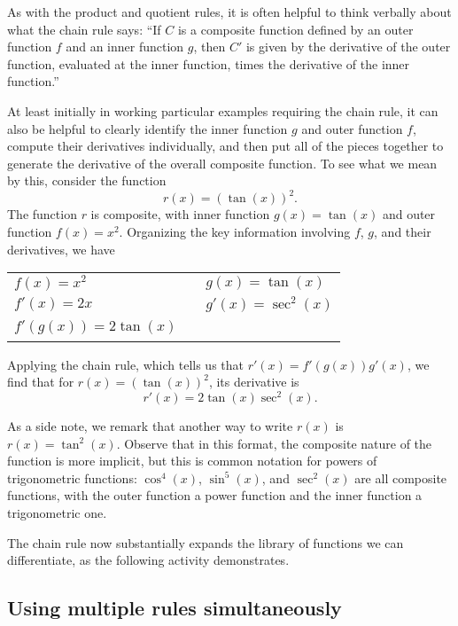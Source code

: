 As with the product and quotient rules, it is often helpful to think verbally about what the chain rule says: ``If $C$ is a composite function defined by an outer function $f$ and an inner function $g$, then $C'$ is given by the derivative of the outer function, evaluated at the inner function, times the derivative of the inner function.''  

At least initially in working particular examples requiring the chain rule, it can also be helpful to clearly identify the inner function $g$ and outer function $f$, compute their derivatives individually, and then put all of the pieces together to generate the derivative of the overall composite function.  To see what we mean by this, consider the function
$$r(x) = (\tan(x))^2.$$
The function $r$ is composite, with inner function $g(x) = \tan(x)$ and outer function $f(x) = x^2$.  Organizing the key information involving $f$, $g$, and their derivatives, we have

\begin{center}
\begin{tabular}{lcl}
$f(x) = x^2$ & \hspace{0.5in} & $g(x) = \tan(x)$ \\
$f'(x) = 2x$ & \hspace{0.5in} & $g'(x) = \sec^2(x)$ \\
$f'(g(x)) = 2\tan(x)$ & \hspace{0.5in} & \ \\
\end{tabular}
\end{center}

Applying the chain rule, which tells us that $r'(x) = f'(g(x)) g'(x)$, we find that for $r(x) = (\tan(x))^2$, its derivative is
$$r'(x) = 2\tan(x) \sec^2(x).$$

As a side note, we remark that another way to write $r(x)$ is $r(x) = \tan^2(x)$.  Observe that in this format, the composite nature of the function is more implicit, but this is common notation for powers of trigonometric functions:  $\cos^4(x)$, $\sin^5(x)$, and $\sec^2(x)$ are all composite functions, with the outer function a power function and the inner function a trigonometric one.

The chain rule now substantially expands the library of functions we can differentiate, as the following activity demonstrates.



\subsection*{Using multiple rules simultaneously}

